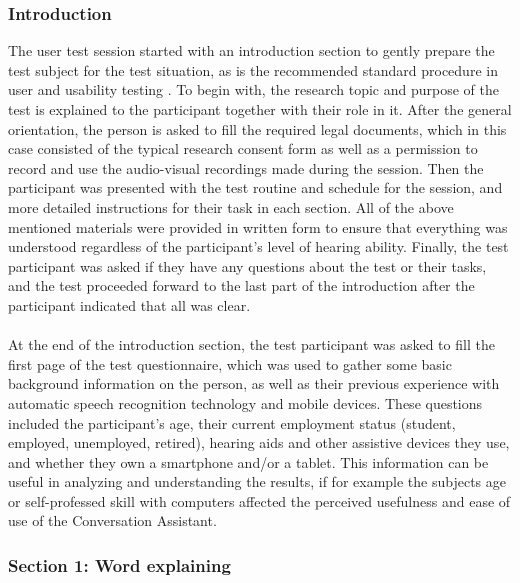 \documentclass[english, 12pt, a4paper, pdftex, elec, utf8]{aaltothesis}
\begin{document}
\subsubsection{Introduction}

The user test session started with an introduction section to gently prepare the test subject for the test situation, as is the recommended standard procedure in user and usability testing \cite{rubin2008handbook}. To begin with, the research topic and purpose of the test is explained to the participant together with their role in it. After the general orientation, the person is asked to fill the required legal documents, which in this case consisted of the typical research consent form as well as a permission to record and use the audio-visual recordings made during the session. Then the participant was presented with the test routine and schedule for the session, and more detailed instructions for their task in each section. All of the above mentioned materials were provided in written form to ensure that everything was understood regardless of the participant's level of hearing ability. Finally, the test participant was asked if they have any questions about the test or their tasks, and the test proceeded forward to the last part of the introduction after the participant indicated that all was clear. \\\\
At the end of the introduction section, the test participant was asked to fill the first page of the test questionnaire, which was used to gather some basic background information on the person, as well as their previous experience with automatic speech recognition technology and mobile devices. These questions included the participant's age, their current employment status (student, employed, unemployed, retired), hearing aids and other assistive devices they use, and whether they own a smartphone and/or a tablet. This information can be useful in analyzing and understanding the results, if for example the subjects age or self-professed skill with computers affected the perceived usefulness and ease of use of the Conversation Assistant.

\subsubsection{Section 1: Word explaining}
\end{document}

